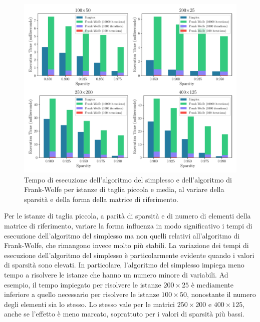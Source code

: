 \begin{figure}[!ht]
    \centering
    \includegraphics[width=\textwidth]{assets/figures/timeshape.pdf}
    \caption{Tempo di esecuzione dell'algoritmo del simplesso e dell'algoritmo di Frank-Wolfe per istanze di taglia
    piccola e media, al variare della sparsità e della forma della matrice di riferimento.}
    \label{fig:timeshape}
\end{figure}

Per le istanze di taglia piccola, a parità di sparsità e di numero di elementi della matrice di riferimento, variare la
forma influenza in modo significativo i tempi di esecuzione dell'algoritmo del simplesso ma non quelli relativi
all'algoritmo di Frank-Wolfe, che rimangono invece molto più stabili. La variazione dei tempi di esecuzione
dell'algoritmo del simplesso è particolarmente evidente quando i valori di sparsità sono elevati. In particolare,
l'algoritmo del simplesso impiega meno tempo a risolvere le istanze che hanno un numero minore di variabili. Ad esempio,
il tempo impiegato per risolvere le istanze \( 200\times 25 \) è mediamente inferiore a quello necessario per risolvere
le istanze  \( 100\times 50 \), nonostante il numero degli elementi sia lo stesso. Lo stesso vale per le matrici \(
250\times 200 \) e  \( 400\times 125 \), anche se l'effetto è meno marcato, soprattuto per i valori di sparsità più
bassi.

